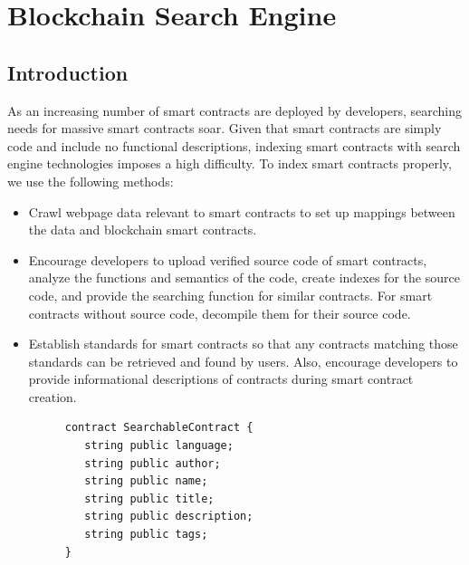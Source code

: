 \section{Blockchain Search Engine}
\label{sec:search}

\subsection{Introduction}

As an increasing number of smart contracts are deployed by developers, searching needs for massive smart contracts soar. Given that smart contracts are simply code and include no functional descriptions, indexing smart contracts with search engine technologies imposes a high difficulty. To index smart contracts properly, we use the following methods:


\begin{itemize}
	\item Crawl webpage data relevant to smart contracts to set up mappings between the data and blockchain smart contracts.
	\item Encourage developers to upload verified source code of smart contracts, analyze the functions and semantics of the code, create indexes for the source code, and provide the searching function for similar contracts. For smart contracts without source code, decompile them for their source code.
	\item Establish standards for smart contracts so that any contracts matching those standards can be retrieved and found by users. Also, encourage developers to provide informational descriptions of contracts during smart contract creation. \\

	\begin{figure}[ht]
  	\centering
  	\begin{minipage}{.4\linewidth}
	\begin{lstlisting}[frame=single]
contract SearchableContract {
   string public language;
   string public author;
   string public name;
   string public title;
   string public description;
   string public tags;
}
	\end{lstlisting}
  	\end{minipage}
	\end{figure}

\end{itemize}

